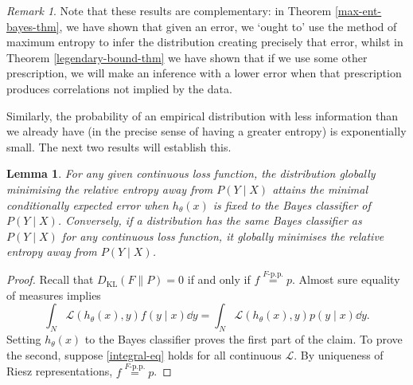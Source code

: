 \documentclass[11pt]{amsart}
\numberwithin{equation}{section}
\newtheorem{lemma}{Lemma}[section]
\theoremstyle{remark}
\newtheorem{remark}{Remark}[section]
\theoremstyle{remark}
\newcommand{\lag}{\mathcal{L}}
\begin{document}
\begin{remark}
    Note that these results are complementary: in Theorem \ref{max-ent-bayes-thm}, we have shown that given an error, we `ought to' use the method of maximum entropy to infer the distribution creating precisely that error, whilst in Theorem \ref{legendary-bound-thm} we have shown that if we use some other prescription, we will make an inference with a lower error when that prescription produces correlations not implied by the data.
\end{remark}


Similarly, the probability of an empirical distribution with less information than we already have (in the precise sense of having a greater entropy) is exponentially small. The next two results will establish this. 

\begin{lemma}\label{min-lem}
    For any given continuous loss function, the distribution globally minimising the relative entropy away from $P(Y \mid X)$ attains the minimal conditionally expected error when $h_\theta(x)$ is fixed to the Bayes classifier of $P(Y \mid X)$. Conversely, if a distribution has the same Bayes classifier as $P(Y \mid X)$ for any continuous loss function, it globally minimises the relative entropy away from $P(Y \mid X)$. 
\end{lemma}
\begin{proof}
    Recall that $D_{\mathrm{KL}}(F \| P) = 0$ if and only if $f \overset{F\text{-p.p.}}{=} p$. Almost sure equality of measures implies 
    \begin{equation}\label{integral-eq}
        \int_N \lag(h_\theta(x), y) f(y \mid x) \dd y = \int_N \lag(h_\theta(x), y) p(y \mid x)\dd y.
    \end{equation}
    Setting $h_\theta(x)$ to the Bayes classifier proves the first part of the claim. To prove the second, suppose \eqref{integral-eq} holds for all continuous $\lag$. By uniqueness of Riesz representations, $f \overset{F\text{-p.p.}}{=} p$.
\end{proof}
\end{document}
